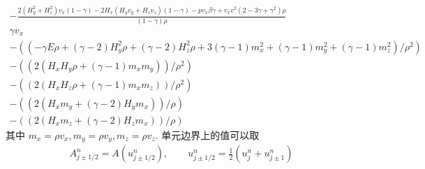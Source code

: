 \documentclass[10.5pt
]{article}
\begin{document}
\begin{subequations}
	\begin{gather}
-\frac{2 (H_y^2+H_z^2) v_x (1- \gamma) -2 H_x (H_y v_y+H_z v_z )(1 - \gamma) - p v_x \beta \gamma + v_x v^2 (2 - 3 \gamma + \gamma^2) \rho}{(1 - \gamma) \rho}\\
  \gamma v_x   \\
  -((-\gamma E \rho+(\gamma-2) H_y^2 \rho+(\gamma-2) H_z^2 \rho+3 (\gamma-1) m_x^2+(\gamma-1) m_y^2+(\gamma-1) m_z^2)/\rho^2)   \\
  -((2 (H_x H_y \rho+(\gamma-1) m_x m_y))/\rho^2)   \\
  -((2 (H_x H_z \rho+(\gamma-1) m_x m_z))/\rho^2)   \\
  -((2 (H_x m_y+(\gamma-2) H_y m_x))/\rho)   \\
  -((2 (H_x m_z+(\gamma-2) H_z m_x))/\rho) 
\end{gather}
\end{subequations}
其中
$ m_x = \rho v_x,
m_y = \rho v_y,
m_z = \rho v_z.$
单元边界上的值可以取
\begin{align}
A_{j \pm 1/2}^n = A(u_{j \pm 1/2}^n), \qquad u_{j \pm 1/2}^n = \frac{1}{2} (u_j^n + u_{j \pm 1}^n)
\end{align}
\end{document}
